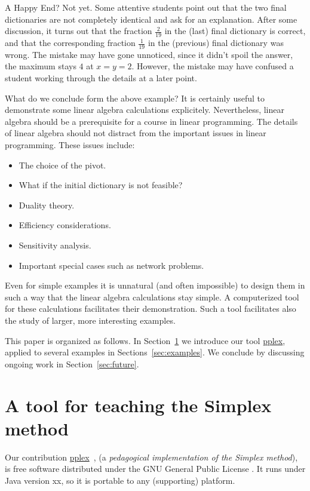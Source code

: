 \documentclass[ukenglish]{nik}
\begin{document}
A Happy End? Not yet. Some attentive students point out that the two final dictionaries
are not completely identical and ask for an explanation. After some discussion, it turns
out that the fraction $\frac{2}{19}$ in the (last) final dictionary is correct,
and that the corresponding fraction $\frac{1}{19}$ in the (previous) final dictionary was wrong.
The mistake may have gone unnoticed, since it didn't spoil the answer, the maximum stays
$4$ at $x=y=2$. However, the mistake may have confused a student working through the details at a later point.

What do we conclude form the above example? It is certainly useful to demonstrate some
linear algebra calculations explicitely. Nevertheless, linear algebra should be a prerequisite for a course
in linear programming. The details of linear algebra should not distract from the important
issues in linear programming. These issues include:
\begin{itemize}
\item The choice of the pivot.
\item What if the initial dictionary is not feasible?
\item Duality theory.
\item Efficiency considerations.
\item Sensitivity analysis.
\item Important special cases such as network problems.
\end{itemize}
Even for simple examples it is unnatural (and often impossible)
to design them in such a way that the linear algebra calculations stay simple.
A computerized tool for these calculations facilitates their demonstration. Such a tool facilitates also the study of larger, more interesting examples. 

This paper is organized as follows.
In Section~\ref{sec:pplex} we introduce 
our tool \url{pplex}, applied to several examples in Sections~\ref{sec:examples}.
We conclude by discussing ongoing work in Section~\ref{sec:future}.

\section{A tool for teaching the Simplex method}\label{sec:pplex}
Our contribution \url{pplex}~\cite{pplex},
(a \emph{pedagogical implementation of the Simplex method}),
is free software distributed under the GNU General Public License \cite{GNUGPL}.
It runs under Java version xx, so it is portable to any (supporting) platform.
\end{document}
